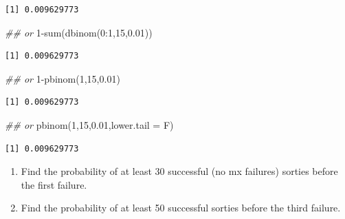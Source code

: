 \documentclass[
  letterpaper,
  DIV=11,
  numbers=noendperiod]{scrreprt}
\newenvironment{Shaded}{\begin{snugshade}}{\end{snugshade}}
\newcommand{\AttributeTok}[1]{\textcolor[rgb]{0.40,0.45,0.13}{#1}}
\newcommand{\DecValTok}[1]{\textcolor[rgb]{0.68,0.00,0.00}{#1}}
\newcommand{\DocumentationTok}[1]{\textcolor[rgb]{0.37,0.37,0.37}{\textit{#1}}}
\newcommand{\FloatTok}[1]{\textcolor[rgb]{0.68,0.00,0.00}{#1}}
\newcommand{\FunctionTok}[1]{\textcolor[rgb]{0.28,0.35,0.67}{#1}}
\newcommand{\NormalTok}[1]{\textcolor[rgb]{0.00,0.23,0.31}{#1}}
\newcommand{\SpecialCharTok}[1]{\textcolor[rgb]{0.37,0.37,0.37}{#1}}
\providecommand{\tightlist}{%
  \setlength{\itemsep}{0pt}\setlength{\parskip}{0pt}}\usepackage{longtable,booktabs,array}
\begin{document}
\begin{verbatim}
[1] 0.009629773
\end{verbatim}

\begin{Shaded}
\begin{Highlighting}[]
\DocumentationTok{\#\# or}
\DecValTok{1}\SpecialCharTok{{-}}\FunctionTok{sum}\NormalTok{(}\FunctionTok{dbinom}\NormalTok{(}\DecValTok{0}\SpecialCharTok{:}\DecValTok{1}\NormalTok{,}\DecValTok{15}\NormalTok{,}\FloatTok{0.01}\NormalTok{))}
\end{Highlighting}
\end{Shaded}

\begin{verbatim}
[1] 0.009629773
\end{verbatim}

\begin{Shaded}
\begin{Highlighting}[]
\DocumentationTok{\#\# or}
\DecValTok{1}\SpecialCharTok{{-}}\FunctionTok{pbinom}\NormalTok{(}\DecValTok{1}\NormalTok{,}\DecValTok{15}\NormalTok{,}\FloatTok{0.01}\NormalTok{)}
\end{Highlighting}
\end{Shaded}

\begin{verbatim}
[1] 0.009629773
\end{verbatim}

\begin{Shaded}
\begin{Highlighting}[]
\DocumentationTok{\#\# or }
\FunctionTok{pbinom}\NormalTok{(}\DecValTok{1}\NormalTok{,}\DecValTok{15}\NormalTok{,}\FloatTok{0.01}\NormalTok{,}\AttributeTok{lower.tail =}\NormalTok{ F)}
\end{Highlighting}
\end{Shaded}

\begin{verbatim}
[1] 0.009629773
\end{verbatim}

\begin{enumerate}
\def\labelenumi{\alph{enumi}.}
\setcounter{enumi}{2}
\tightlist
\item
  Find the probability of at least 30 successful (no mx failures)
  sorties before the first failure.\\
\item
  Find the probability of at least 50 successful sorties before the
  third failure.
\end{enumerate}
\end{document}

